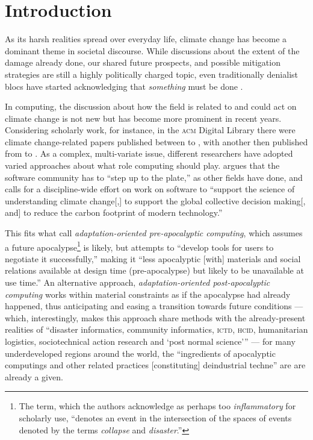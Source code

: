 \section{Introduction}

As its harsh realities spread %
over everyday life, climate change has become a dominant theme in societal discourse. While discussions about the extent of the damage already done, our shared future prospects, and possible mitigation strategies are still a highly politically charged topic, even traditionally denialist blocs have started acknowledging that \emph{something} must be done \cite{teirstein_2021}.  

In computing, the discussion about how the field is related to and could act on climate change is not new but has become more prominent in recent years. Considering scholarly work, for instance, in the \textsc{acm} Digital Library there were  climate change-related papers published between  to , with another  then published from  to  \cite{ferreiraClimateChangeCommunication2021}. As a complex, multi-variate issue, different researchers have adopted varied approaches about what role computing should play. \citet{easterbrook2010climate} argues that the software community has to ``step up to the plate,'' as other fields have done, and calls for a discipline-wide effort on work on software to ``support the science of understanding climate change[,] to support the global collective decision making[, and] to reduce the carbon footprint of modern technology.''

This fits what \citet{silberman2010precarious} call \emph{adaptation-oriented pre-apocalyptic computing}, which assumes a future apocalypse\footnote{The term, which the authors acknowledge as perhaps too \emph{inflammatory} for scholarly use, ``denotes an event in the intersection of the spaces of events denoted by the terms \emph{collapse} and \emph{disaster}.''} is likely, but attempts to ``develop tools for users to negotiate it successfully,'' making it ``less apocalyptic [with] materials and social relations available at design time (pre-apocalypse) but likely to be unavailable at use time.'' An alternative approach, \emph{adaptation-oriented post-apocalyptic computing} works within material constraints as if the apocalypse had already happened, thus anticipating and easing a transition towards future conditions --- which, interestingly, makes this approach share methods with the already-present realities of ``disaster informatics, community informatics, \textsc{ictd}, \textsc{hcid}, humanitarian logistics, sociotechnical action research and `post normal science''' --- for many underdeveloped regions around the world, the ``ingredients of apocalyptic computings and other related practices [constituting] deindustrial techne'' are are already a given.

